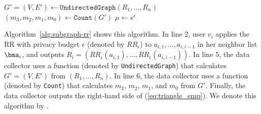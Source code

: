 \begin{algorithm}
  \SetAlgoLined
  $G'=(V,E') \leftarrow \texttt{UndirectedGraph}(R_1, \ldots, R_n)$\;
  $(m_3, m_2, m_1, m_0) \leftarrow \texttt{Count}(G')$\;
  $\mu \leftarrow e^\epsilon$\;

  \caption{\label{alg:subgraph-rr}}
\end{algorithm}

Algorithm~\ref{alg:subgraph-rr} shows this algorithm. 
In line 2, user $v_i$ applies the RR with privacy budget $\epsilon$ (denoted by $RR_\epsilon$) to $a_{i,1}, \ldots, a_{i,i-1}$ 
in her neighbor list $\bma_i$, and outputs $R_i = (RR_\epsilon(a_{i,1}), \ldots, RR_\epsilon(a_{i,i-1}))$. 
In line 5, the data collector uses a function (denoted by \texttt{UndirectedGraph}) that calculates $G'=(V,E')$ from $(R_1, \ldots, R_n)$. 
In line 6, the data collector uses a function (denoted by 
\texttt{Count}) that calculates $m_3$, $m_2$, $m_1$, and $m_0$ from $G'$. 
Finally, the data collector outputs the right-hand side of (\ref{eq:triangle_emp}). 
We denote this algorithm by .



